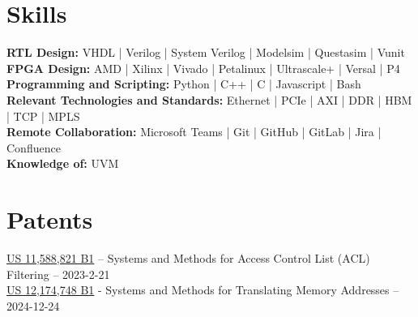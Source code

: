\documentclass[1pt]{deedy-resume-reversed}
\begin{document}
\begin{minipage}[t]{1.0\textwidth}




\section{Skills}
\textbf{RTL Design:} VHDL | Verilog | System Verilog | Modelsim | Questasim | Vunit \\
\textbf{FPGA Design:} AMD | Xilinx | Vivado | Petalinux | Ultrascale+ | Versal | P4 \\
\textbf{Programming and Scripting:} Python | C++ | C | Javascript | Bash \\
\textbf{Relevant Technologies and Standards:} Ethernet | PCIe | AXI | DDR | HBM | TCP | MPLS \\
\textbf{Remote Collaboration:} Microsoft Teams | Git | GitHub | GitLab | Jira | Confluence \\
\textbf{Knowledge of:} UVM \\
\sectionsep


\section{Patents}
\href{https://image-ppubs.uspto.gov/dirsearch-public/print/downloadPdf/11588821}{US 11,588,821 B1}
– Systems and Methods for Access Control List (ACL) Filtering – 2023-2-21 \\
\href{https://image-ppubs.uspto.gov/dirsearch-public/print/downloadPdf/12174748}{US 12,174,748 B1}
- Systems and Methods for Translating Memory Addresses – 2024-12-24 \\
\sectionsep

\end{minipage}
\end{document}
